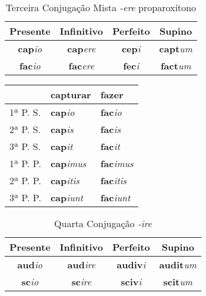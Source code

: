 \documentclass{book}
\newcommand{\radicaldesinencia}[2]{\textbf{#1}\textit{#2}}
\begin{document}
\begin{table}
\centering
\caption{Terceira Conjugação Mista \textit{-ere} proparoxítono}
\vspace{0.2cm}
\begin{tabular}{c|c|c|c}
\hline
Presente		&	Infinitivo		&	Perfeito		&	Supino	\\
\hline                                    		
\radicaldesinencia{cap}{io}	&	\radicaldesinencia{cap}{ere}	&	\radicaldesinencia{cep}{i}	&	\radicaldesinencia{capt}{um}	\\
\radicaldesinencia{fac}{io}	&	\radicaldesinencia{fac}{ere}	&	\radicaldesinencia{fec}{i}	&	\radicaldesinencia{fact}{um} 	\\
 \hline
\end{tabular}
\end{table}

\begin{table}
\centering
\begin{tabular}{l|l|l}
\hline
 & capturar & fazer \\
 \hline
1ª P. S.	&  \radicaldesinencia{cap}{io}		& \radicaldesinencia{fac}{io}		\\
2ª P. S.	&  \radicaldesinencia{cap}{is} 	& \radicaldesinencia{fac}{is}		\\
3ª P. S.	&  \radicaldesinencia{cap}{it} 	& \radicaldesinencia{fac}{it}		 \\
\hline
\hline
1ª P. P.	&  \radicaldesinencia{cap}{imus} 	& \radicaldesinencia{fac}{imus}	 \\
2ª P. P. 	&  \radicaldesinencia{cap}{itis} 	& \radicaldesinencia{fac}{itis} 	 \\
3ª P. P.	&  \radicaldesinencia{cap}{iunt} 	& \radicaldesinencia{fac}{iunt}		 \\ 
\hline
\end{tabular}
\end{table}
\clearpage

\begin{table}
\centering
\caption{Quarta Conjugação \textit{-ire} }
\vspace{0.2cm}
\begin{tabular}{c|c|c|c}
\hline
Presente		&	Infinitivo		&	Perfeito		&	Supino	\\
\hline                                    		
\radicaldesinencia{aud}{io}	&	\radicaldesinencia{aud}{ire}	&	\radicaldesinencia{audiv}{i}	&	\radicaldesinencia{audit}{um}	\\
\radicaldesinencia{sc}{io}	&	\radicaldesinencia{sc}{ire}	&	\radicaldesinencia{sciv}{i}	&	\radicaldesinencia{scit}{um}	\\
 \hline
\end{tabular}
\end{table}
\end{document}
